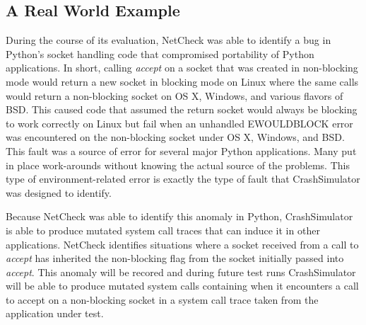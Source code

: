     \subsection{A Real World Example}

    During the course of its evaluation, NetCheck was able to identify a bug in Python's socket handling code that
    compromised portability of Python applications. In short, calling \emph{accept} on a socket that was created in
    non-blocking mode would return a new socket in blocking mode on Linux where the same calls would return a
    non-blocking socket on OS X, Windows, and various flavors of BSD\@. This caused code that assumed the return
    socket would always be blocking to work correctly on Linux but fail when an unhandled EWOULDBLOCK error was
    encountered on the non-blocking socket under OS X, Windows, and BSD\@. This fault was a source of error for
    several major Python applications. Many put in place work-arounds without knowing the actual source of the
    problems.  This type of environment-related error is exactly the type of fault that CrashSimulator was designed
    to identify.

    Because NetCheck was able to identify this anomaly in Python, CrashSimulator is able to produce mutated system
    call traces that can induce it in other applications. NetCheck identifies situations where a socket received
    from a call to \emph{accept} has inherited the non-blocking flag from the socket initially passed into
    \emph{accept}. This anomaly will be recored and during future test runs CrashSimulator will be able to produce
    mutated system calls containing when it encounters a call to accept on a non-blocking socket in a system call
    trace taken from the application under test.
